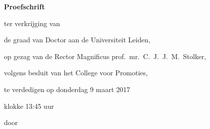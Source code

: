 \begin{titlepage}

\begin{center}

\vspace*{2\bigskipamount}

{\makeatletter
\titlestyle\bfseries\LARGE\@title
\makeatother}

{\makeatletter
\ifx\@subtitle\undefined\else
    \bigskip
    \titlefont\titleshape\Large\@subtitle
\fi
\makeatother}

\end{center}

\cleardoublepage
\thispagestyle{empty}

\begin{center}


\vspace*{2\bigskipamount}

{\makeatletter
\titlestyle\bfseries\LARGE\@title
\makeatother}

{\makeatletter
\ifx\@subtitle\undefined\else
    \bigskip
    \titlefont\titleshape\Large\@subtitle
\fi
\makeatother}

\vfill


{\Large\titlefont\bfseries Proefschrift}

\bigskip
\bigskip

ter verkrijging van 

de graad van Doctor aan de Universiteit Leiden,

op gezag van de Rector Magnificus prof.~mr.~C.~J.~J.~M.~Stolker,

volgens besluit van het College voor Promoties,

te verdedigen op donderdag 9 maart 2017 

klokke 13:45 uur

\bigskip
\bigskip

door

\bigskip
\bigskip

\makeatletter
{\Large\titlefont\bfseries\@firstname\ {\titleshape\@lastname}}
\makeatother


\end{center}
\end{titlepage}
